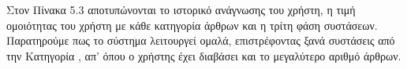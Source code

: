 Στον Πίνακα 5.3 αποτυπώνονται το ιστορικό ανάγνωσης του χρήστη, 
η τιμή ομοιότητας του χρήστη με κάθε κατηγορία άρθρων και η τρίτη φάση συστάσεων. 
Παρατηρούμε πως το σύστημα λειτουργεί ομαλά, επιστρέφοντας ξανά συστάσεις 
από την Κατηγορία {}, απ' όπου ο χρήστης έχει διαβάσει και το μεγαλύτερο 
αριθμό άρθρων. \\

\newpage 


